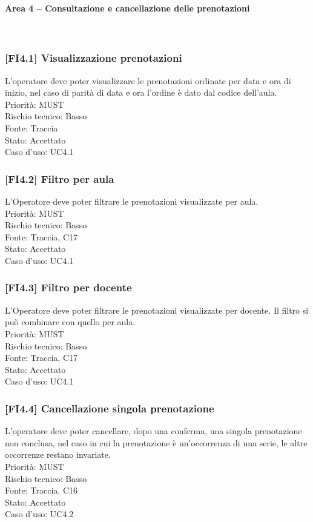 \paragraph{Area 4 – Consultazione e cancellazione delle prenotazioni}~\\
\subsubsection{[FI4.1] Visualizzazione prenotazioni}
L'operatore deve poter visualizzare le prenotazioni ordinate per data e ora di inizio, nel caso di parità di data e ora l'ordine è dato dal codice dell'aula.\\
Priorità: MUST\\Rischio tecnico: Basso\\Fonte: Traccia\\Stato: Accettato\\Caso d'uso: UC4.1

\subsubsection{[FI4.2] Filtro per aula}
L'Operatore deve poter filtrare le prenotazioni visualizzate per aula.\\
Priorità: MUST\\Rischio tecnico: Basso\\Fonte: Traccia, C17\\Stato: Accettato\\Caso d'uso: UC4.1

\subsubsection{[FI4.3] Filtro per docente}
L'Operatore deve poter filtrare le prenotazioni visualizzate per docente. Il filtro si può combinare con quello per aula.\\
Priorità: MUST\\Rischio tecnico: Basso\\Fonte: Traccia, C17\\Stato: Accettato\\Caso d'uso: UC4.1

\subsubsection{[FI4.4] Cancellazione singola prenotazione}
L'operatore deve poter cancellare, dopo una conferma, una singola prenotazione non conclusa, nel caso in cui la prenotazione è un'occorrenza di una serie, le altre occorrenze restano invariate.\\
Priorità: MUST\\Rischio tecnico: Basso\\Fonte: Traccia, C16\\Stato: Accettato\\Caso d'uso: UC4.2

